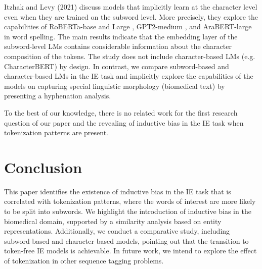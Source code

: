 \documentclass[runningheads]{llncs}
\begin{document}
Itzhak and Levy (2021) \cite{itzhak2021models} discuss models that implicitly learn at the character level even when they are trained on the subword level. More precisely, they explore the capabilities of RoBERTa-base and Large \cite{liu2019roberta}, GPT2-medium \cite{radford2019language}, and AraBERT-large \cite{antoun-etal-2020-arabert} in word spelling. The main results indicate that the embedding layer of the subword-level LMs contains considerable information about the character composition of the tokens. The study does not include character-based LMs (e.g. CharacterBERT) by design. In contrast, we compare subword-based and character-based LMs in the IE task and implicitly explore the capabilities of the models on capturing special linguistic morphology (biomedical text) by presenting a hyphenation analysis.

To the best of our knowledge, there is no related work for the first research question of our paper and the revealing of inductive bias in the IE task when tokenization patterns are present.
\vspace{-4mm}

\section{Conclusion}
\vspace{-2.5mm}
This paper identifies the existence of inductive bias in the IE task that is correlated with tokenization patterns, where the words of interest are more likely to be split into subwords. We highlight the introduction of inductive bias in the biomedical domain, supported by a similarity analysis based on entity representations. Additionally, we conduct a comparative study, including subword-based and character-based models, pointing out that the transition to token-free IE models is achievable. In future work, we intend to explore the effect of tokenization in other sequence tagging problems.
\vspace{-4mm}
\end{document}
